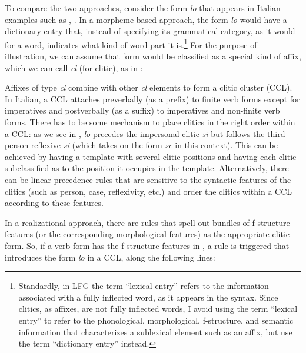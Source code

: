 \documentclass[output=paper,hidelinks]{langscibook}
\begin{document}
To compare the two approaches, consider the form \textit{lo} that appears in Italian examples such as , . In a morpheme-based approach, the form \textit{lo} would have a dictionary entry that, instead of specifying its grammatical category, as it would for a word, indicates what kind of word part it is.\footnote{Standardly, in LFG the term ``lexical entry'' refers to the information associated with a fully inflected word, as it appears in the syntax. Since clitics, as affixes, are not fully inflected words, I avoid using the term ``lexical entry'' to refer to the phonological, morphological, f-structure, and semantic information that characterizes a sublexical element such as an affix, but use the term ``dictionary entry'' instead.} For the purpose of illustration, we can assume that form would be classified as a special kind of affix, which we can call \textit{cl} (for clitic), as in :

\ea\label{ex:Romance:6}
\z
Affixes of type \textit{cl} combine with other \textit{cl} elements to form a clitic cluster (CCL). In Italian, a CCL attaches preverbally (as a prefix) to finite verb forms except for imperatives and postverbally (as a suffix) to imperatives and non-finite verb forms. There has to be some mechanism to place clitics in the right order within a CCL: as we see in , \textit{lo} precedes the impersonal clitic \textit{si} but follows the third person reflexive \textit{si} (which takes on the form \textit{se} in this context). This can be achieved by having a template with several clitic positions and having each clitic subclassified as to the position it occupies in the template. Alternatively, there can be linear precedence rules that are sensitive to the syntactic features of the clitics (such as person, case, reflexivity, etc.) and order the clitics within a CCL according to these features.

In a realizational approach, there are rules that spell out bundles of f-structure features (or the corresponding morphological features) as the appropriate clitic form. So, if a verb form has the f-structure features in , a rule is triggered that introduces the form \textit{lo} in a CCL, along the following lines:
\end{document}
